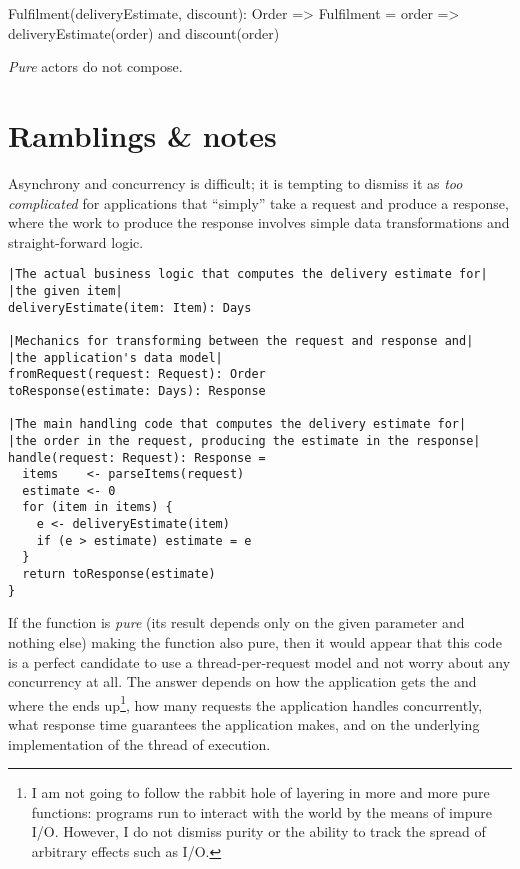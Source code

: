 Fulfilment(deliveryEstimate, discount): Order => Fulfilment =
  order =>
    deliveryEstimate(order) and discount(order)

\emph{Pure} actors do not compose. 


\section{Ramblings \& notes}
Asynchrony and concurrency is difficult; it is tempting to dismiss it as \emph{too complicated} for applications that ``simply'' take a request and produce a response, where the work to produce the response involves simple data transformations and straight-forward logic.

\begin{lstlisting}[caption={Delivery estimate}, label={code:delivery-estimate}, language=Pseudo, escapechar=|]
|The actual business logic that computes the delivery estimate for|
|the given item|
deliveryEstimate(item: Item): Days

|Mechanics for transforming between the request and response and|
|the application's data model|
fromRequest(request: Request): Order
toResponse(estimate: Days): Response

|The main handling code that computes the delivery estimate for|
|the order in the request, producing the estimate in the response|
handle(request: Request): Response = 
  items    <- parseItems(request)
  estimate <- 0
  for (item in items) {
    e <- deliveryEstimate(item)
    if (e > estimate) estimate = e
  }
  return toResponse(estimate)
}
\end{lstlisting}

If the  function is \emph{pure} (its result depends only on the given parameter and nothing else) making the  function also pure, then it would appear that this code is a perfect candidate to use a thread-per-request model and not worry about any concurrency at all. The answer depends on how the application gets the  and where the  ends up\footnote{I am not going to follow the rabbit hole of layering in more and more pure functions: programs run to interact with the world by the means of impure I/O. However, I do not dismiss purity or the ability to track the spread of arbitrary effects such as I/O.}, how many requests the application handles concurrently, what response time guarantees the application makes, and on the underlying implementation of the thread of execution.

